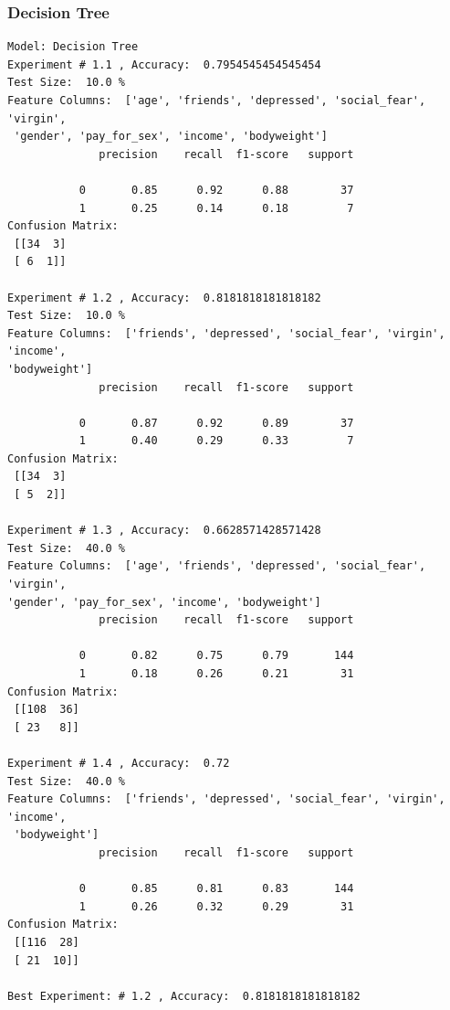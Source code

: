 \documentclass{article}
\begin{document}
\subsubsection{Decision Tree}
\begin{commandline}
	\begin{verbatim}
Model: Decision Tree
Experiment # 1.1 , Accuracy:  0.7954545454545454
Test Size:  10.0 %
Feature Columns:  ['age', 'friends', 'depressed', 'social_fear', 'virgin',
 'gender', 'pay_for_sex', 'income', 'bodyweight']
              precision    recall  f1-score   support

           0       0.85      0.92      0.88        37
           1       0.25      0.14      0.18         7
Confusion Matrix:
 [[34  3]
 [ 6  1]]

Experiment # 1.2 , Accuracy:  0.8181818181818182
Test Size:  10.0 %
Feature Columns:  ['friends', 'depressed', 'social_fear', 'virgin', 'income', 
'bodyweight']
              precision    recall  f1-score   support

           0       0.87      0.92      0.89        37
           1       0.40      0.29      0.33         7
Confusion Matrix:
 [[34  3]
 [ 5  2]]

Experiment # 1.3 , Accuracy:  0.6628571428571428
Test Size:  40.0 %
Feature Columns:  ['age', 'friends', 'depressed', 'social_fear', 'virgin', 
'gender', 'pay_for_sex', 'income', 'bodyweight']
              precision    recall  f1-score   support

           0       0.82      0.75      0.79       144
           1       0.18      0.26      0.21        31
Confusion Matrix:
 [[108  36]
 [ 23   8]]

Experiment # 1.4 , Accuracy:  0.72
Test Size:  40.0 %
Feature Columns:  ['friends', 'depressed', 'social_fear', 'virgin', 'income',
 'bodyweight']
              precision    recall  f1-score   support

           0       0.85      0.81      0.83       144
           1       0.26      0.32      0.29        31
Confusion Matrix:
 [[116  28]
 [ 21  10]]

Best Experiment: # 1.2 , Accuracy:  0.8181818181818182
	\end{verbatim}
\end{commandline}
\end{document}
